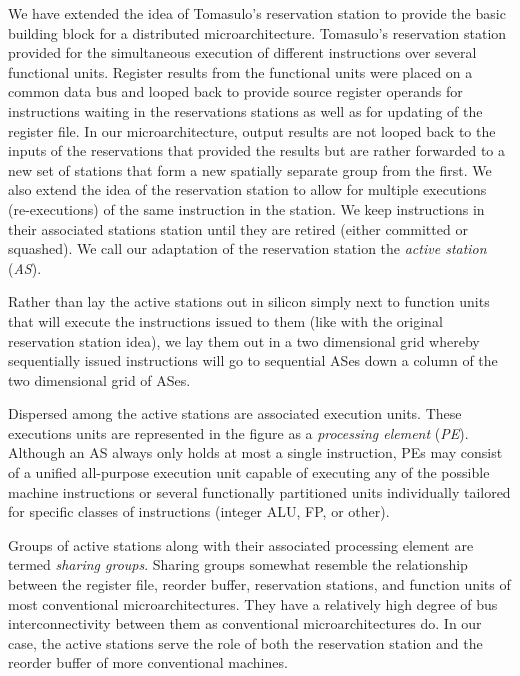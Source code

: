 \documentclass[10pt,dvips]{article}
\begin{document}
We have extended the idea of Tomasulo's reservation
station \cite{Tom67} to provide the basic building block for a distributed
microarchitecture.  Tomasulo's reservation station provided for the
simultaneous execution of different instructions over several
functional units.  
Register results from the functional units were placed on
a common data bus and looped back to provide source register operands 
for instructions waiting in the reservations stations as well as
for updating of the register file.  In our microarchitecture,
output results are not looped back to the inputs of the reservations
that provided the results but are rather forwarded to a new set of
stations that form a new spatially separate group from the first.  
We
also extend the idea of the reservation station to allow for multiple
executions (re-executions) of the same instruction in the station.  We
keep instructions in their associated stations station until they are
retired (either committed or squashed).  We call our adaptation of the
reservation station the \textit{active station} (\textit{AS}).

Rather than lay the active stations out in silicon simply next to
function units that will execute the instructions issued to them
(like with the original reservation station idea),
we lay them out in a two dimensional grid whereby sequentially
issued instructions will go to sequential ASes down a column of
the two dimensional grid of ASes. 

Dispersed among the active stations are associated execution
units.  These executions units are represented in the figure as
a \textit{processing element} (\textit{PE}).  
Although an AS always only holds at most a single instruction,
PEs may consist of a unified all-purpose execution unit capable of
executing any of the possible machine instructions or
several functionally partitioned units individually tailored
for specific classes of instructions (integer ALU, FP, or other).

Groups of active stations along with their associated processing
element
are termed \textit{sharing groups}.  Sharing groups somewhat resemble
the relationship between the register file, reorder buffer,
reservation stations, and function units of most conventional
microarchitectures.  They have a relatively high degree of bus
interconnectivity between them as conventional microarchitectures do.
In our case, the active stations serve the role of both the
reservation station and the reorder buffer of more conventional
machines.
\end{document}

